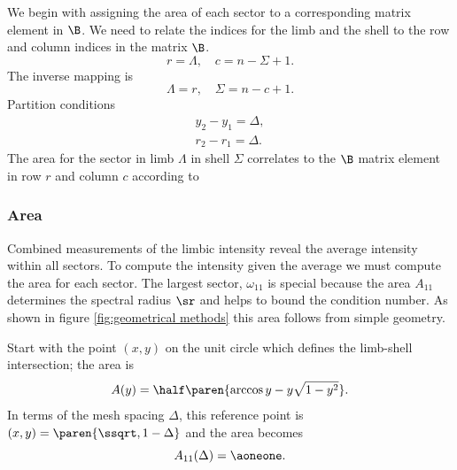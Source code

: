 \documentclass[final,leqno,onefignum,onetabnum]{siamltex1213}
\begin{document}
We begin with assigning the area of each sector to a corresponding matrix element in $\B$. We need to relate the indices for the limb and the shell to the row and column indices in the matrix $\B$.  %
  \begin{equation}
    r = \Lambda, \quad c = n - \Sigma + 1.
    \label{eq:rc}
  \end{equation}
The inverse mapping is
  \begin{equation}
    \Lambda = r, \quad \Sigma = n - c + 1.
    \label{eq:lb}
  \end{equation}
Partition conditions
\begin{equation}
  \begin{split}
    y_{2} - y_{1} = \Delta, \\
    r_{2} - r_{1} = \Delta.
  \end{split}
\end{equation}
 The area for the sector in limb $\Lambda$ in shell $\Sigma$ correlates to the $\B$ matrix element in row $r$ and column $c$ according to

\subsubsection{Area}
Combined measurements of the limbic intensity reveal the average intensity within all sectors. To compute the intensity given the average we must compute the area for each sector. The largest sector, $\omega_{11}$ is special because the area $A_{11}$ determines the spectral radius $\sr$ and helps to bound the condition number. As shown in figure \eqref{fig:geometrical methods} this area follows from simple geometry.

Start with the point $(x,y)$ on the unit circle which defines the limb-shell intersection; the area is
  \begin{equation}
    A(y) = \half \paren{\arccos y - y \sqrt{1-y^{2}}} .
    \label{eq:gm}
  \end{equation}
In terms of the mesh spacing $\Delta$, this reference point is $(x,y) = \paren{\ssqrt, 1-\Delta}$ and the area becomes
  \begin{equation}
    A_{11}(\Delta) = \aoneone.
    \label{eq:area delta}
  \end{equation}
\end{document}
